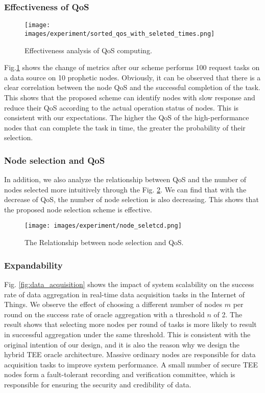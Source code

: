 \documentclass[paper]{ieice}
\begin{document}
\subsubsection{Effectiveness of QoS}
      \begin{figure}[h!]
    \centering
    \texttt{[image: images/experiment/sorted\_qos\_with\_seleted\_times.png]}
    \caption{Effectiveness analysis of QoS computing.}
    \label{fig:QoS}
\end{figure}
Fig.\ref{fig:QoS} shows the change of metrics after our scheme performs 100 request tasks on a data source on 10 prophetic nodes. Obviously, it can be observed that there is a clear correlation between the node QoS and the successful completion of the task. This shows that the proposed scheme can identify nodes with slow response and reduce their QoS according to the actual operation status of nodes. This is consistent with our expectations. The higher the QoS of the high-performance nodes that can complete the task in time, the greater the probability of their selection.

\subsubsection{Node selection and QoS}
In addition, we also analyze the relationship between QoS and the number of nodes selected more intuitively through the Fig. \ref {fig:node_seletced}. We can find that with the decrease of QoS, the number of node selection is also decreasing. This shows that the proposed node selection scheme is effective. 

\begin{figure}[h!]
    \centering
    \texttt{[image: images/experiment/node\_seletcd.png]}
    \caption{The Relationship between node selection and QoS.}
    \label{fig:node_seletced}
\end{figure}

 \subsubsection{Expandability}
Fig. \ref{fig:data_acquisition} shows the impact of system scalability on the success rate of data aggregation in real-time data acquisition tasks in the Internet of Things. We observe the effect of choosing a different number of nodes $m$ per round on the success rate of oracle aggregation with a threshold $n$ of 2. The result shows that selecting more nodes per round of tasks is more likely to result in successful aggregation under the same threshold. This is consistent with the original intention of our design, and it is also the reason why we design the hybrid TEE oracle architecture. Massive ordinary nodes are responsible for data acquisition tasks to improve system performance. A small number of secure TEE nodes form a fault-tolerant recording and verification committee, which is responsible for ensuring the security and credibility of data.
\end{document}
